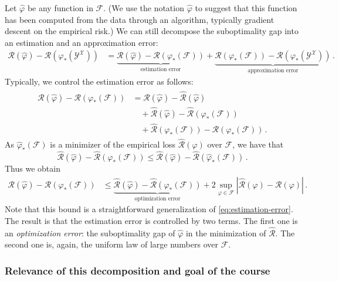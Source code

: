\documentclass[11pt,reqno]{article}
\newcommand{\cF}{\mathcal{F}}
\newcommand{\cX}{\mathcal{X}}
\newcommand{\cY}{\mathcal{Y}}
\newcommand{\cR}{\mathcal{R}}
\renewcommand{\leq}{\leqslant}
\numberwithin{equation}{section}
\theoremstyle{plain}
\theoremstyle{definition}
\theoremstyle{remark}
\begin{document}
	Let $\widehat{\varphi}$ be any function in $\cF$. (We use the notation $\widehat{\varphi}$ to suggest that this function has been computed from the data through an algorithm, typically gradient descent on the empirical risk.) We can still decompose the suboptimality gap into an estimation and an approximation error:
	\begin{align}
		\cR(\widehat{\varphi}) - \cR(\varphi_*(\cY^\cX)) &= \underbrace{\cR(\widehat{\varphi}) - \cR(\varphi_*(\cF))}_{\text{estimation error}} + \underbrace{\cR(\varphi_*(\cF)) - \cR(\varphi_*(\cY^\cX))}_{\text{approximation error}} \, .\label{eq:decomposition-1}
	\end{align}
	Typically, we control the estimation error as follows:
	\begin{align}
		\label{eq:decomposition-2}
		\begin{split}
			\cR(\widehat{\varphi}) - \cR(\varphi_*(\cF)) &= \cR(\widehat{\varphi}) - \widehat{\cR}(\widehat{\varphi}) \\
			&\quad+ \widehat{\cR}(\widehat{\varphi}) - \widehat{\cR}(\varphi_*(\cF)) \\
			&\quad+ \widehat{\cR}(\varphi_*(\cF)) - \cR(\varphi_*(\cF)) \, .
		\end{split}
	\end{align}
	As $\widehat{\varphi}_*(\cF)$ is a minimizer of the empirical loss $\widehat{\cR}(\varphi)$ over $\cF$, we have that 
	\begin{equation}
		\label{eq:decomposition-4}
		\widehat{\cR}(\widehat{\varphi}) - \widehat{\cR}(\varphi_*(\cF))  \leq \widehat{\cR}(\widehat{\varphi}) - \widehat{\cR}(\widehat{\varphi}_*(\cF)) \, .
	\end{equation}
	Thus we obtain 
	\begin{align}
		\label{eq:decomposition-3}
		\cR(\widehat{\varphi}) - \cR(\varphi_*(\cF)) &\leq \underbrace{\widehat{\cR}(\widehat{\varphi}) - \widehat{\cR}(\widehat{\varphi}_*(\cF))}_{\text{optimization error}} + 2 \sup_{\varphi\in\cF} \left|\widehat{\cR}(\varphi) - {\cR}(\varphi)\right| \, . 
	\end{align}
	Note that this bound is a straightforward generalization of \eqref{eq:estimation-error}. The result is that the estimation error is controlled by two terms. The first one is an \emph{optimization error}: the suboptimality gap of $\widehat{\varphi}$ in the minimization of $\widehat{\cR}$. The second one is, again, the uniform law of large numbers over $\cF$.

	\subsubsection{Relevance of this decomposition and goal of the course}
\end{document}
